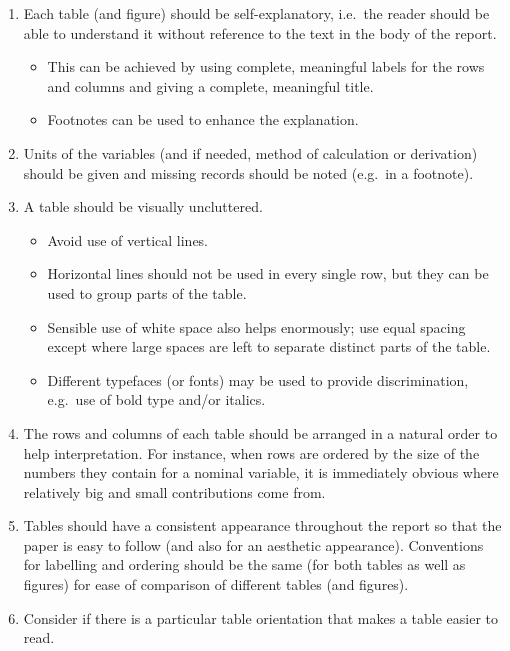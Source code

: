\documentclass[
  a4paper,
]{memoir}
\providecommand{\tightlist}{%
  \setlength{\itemsep}{0pt}\setlength{\parskip}{0pt}}
\begin{document}
\begin{enumerate}
\def\labelenumi{\arabic{enumi}.}
\tightlist
\item
  Each table (and figure) should be self-explanatory, i.e.~the reader
  should be able to understand it without reference to the text in the
  body of the report.

  \begin{itemize}
  \tightlist
  \item
    This can be achieved by using complete, meaningful labels for the
    rows and columns and giving a complete, meaningful title.
  \item
    Footnotes can be used to enhance the explanation.
  \end{itemize}
\item
  Units of the variables (and if needed, method of calculation or
  derivation) should be given and missing records should be noted
  (e.g.~in a footnote).
\item
  A table should be visually uncluttered.

  \begin{itemize}
  \tightlist
  \item
    Avoid use of vertical lines.
  \item
    Horizontal lines should not be used in every single row, but they
    can be used to group parts of the table.
  \item
    Sensible use of white space also helps enormously; use equal spacing
    except where large spaces are left to separate distinct parts of the
    table.
  \item
    Different typefaces (or fonts) may be used to provide
    discrimination, e.g.~use of bold type and/or italics.
  \end{itemize}
\item
  The rows and columns of each table should be arranged in a natural
  order to help interpretation. For instance, when rows are ordered by
  the size of the numbers they contain for a nominal variable, it is
  immediately obvious where relatively big and small contributions come
  from.
\item
  Tables should have a consistent appearance throughout the report so
  that the paper is easy to follow (and also for an aesthetic
  appearance). Conventions for labelling and ordering should be the same
  (for both tables as well as figures) for ease of comparison of
  different tables (and figures).
\item
  Consider if there is a particular table orientation that makes a table
  easier to read.
\end{enumerate}
\end{document}
